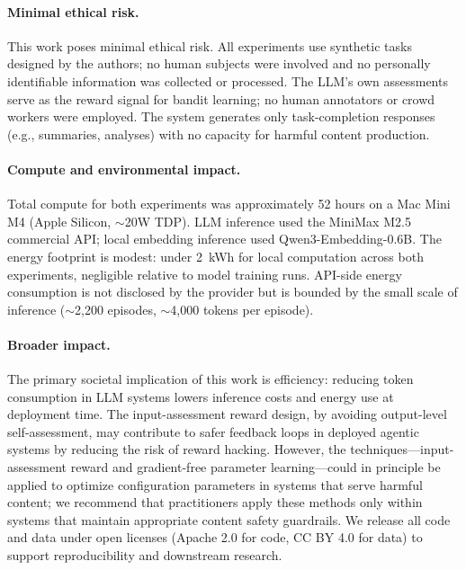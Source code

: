 \paragraph{Minimal ethical risk.}
This work poses minimal ethical risk.
All experiments use synthetic tasks designed by the authors; no human subjects were involved and no personally identifiable information was collected or processed.
The LLM's own assessments serve as the reward signal for bandit learning; no human annotators or crowd workers were employed.
The system generates only task-completion responses (e.g., summaries, analyses) with no capacity for harmful content production.

\paragraph{Compute and environmental impact.}
Total compute for both experiments was approximately 52 hours on a Mac Mini M4 (Apple Silicon, ${\sim}$20W TDP).
LLM inference used the MiniMax M2.5 commercial API; local embedding inference used Qwen3-Embedding-0.6B.
The energy footprint is modest: under 2~kWh for local computation across both experiments, negligible relative to model training runs.
API-side energy consumption is not disclosed by the provider but is bounded by the small scale of inference (${\sim}$2{,}200 episodes, ${\sim}$4{,}000 tokens per episode).

\paragraph{Broader impact.}
The primary societal implication of this work is efficiency: reducing token consumption in LLM systems lowers inference costs and energy use at deployment time.
The input-assessment reward design, by avoiding output-level self-assessment, may contribute to safer feedback loops in deployed agentic systems by reducing the risk of reward hacking.
However, the techniques---input-assessment reward and gradient-free parameter learning---could in principle be applied to optimize configuration parameters in systems that serve harmful content; we recommend that practitioners apply these methods only within systems that maintain appropriate content safety guardrails.
We release all code and data under open licenses (Apache 2.0 for code, CC BY 4.0 for data) to support reproducibility and downstream research.
